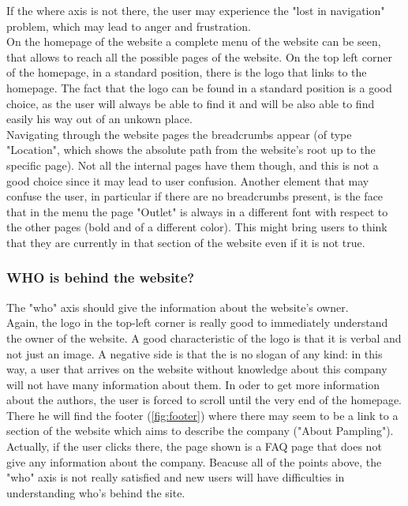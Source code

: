 If the where axis is not there, the user may experience the "lost in navigation" problem, which may lead to anger and frustration.\\
On the homepage of the website a complete menu of the website can be seen, that allows to reach all the possible pages of the website. 
On the top left corner of the homepage, in a standard position, there is the logo that links to the homepage.
The fact that the logo can be found in a standard position is a good choice, as the user will always be able to find it
and will be also able to find easily his way out of an unkown place.\\ 
Navigating through the website pages the breadcrumbs appear (of type "Location", which shows the absolute path from the website's root up to the specific page).
Not all the internal pages have them though, and this is not a good choice since it may lead to user confusion.
Another element that may confuse the user, in particular if there are no breadcrumbs present, is the face that in the menu the page "Outlet" is always in a 
different font with respect to the other pages (bold and of a different color). This might bring users to think that they are currently in that section of the 
website even if it is not true.

\subsubsection{WHO is behind the website?} 
The "who" axis should give the information about the website's owner.\\

Again, the logo in the top-left corner is really good to immediately understand the owner of the website. 
A good characteristic of the logo is that it is verbal and not just an image. 
A negative side is that the is no slogan of any kind: in this way, a user that arrives on the website without knowledge about this company
will not have many information about them.
In oder to get more information about the authors, the user is forced to scroll until the very end of the homepage. 
There he will find the footer (\cref{fig:footer}) where there may seem to be a link to a section of the website which aims to describe the company ("About Pampling").\\
Actually, if the user clicks there, the page shown is a FAQ page that does not give any information about the company.
Beacuse all of the points above, the "who" axis is not really satisfied and new users will have difficulties in understanding who's behind the site.

